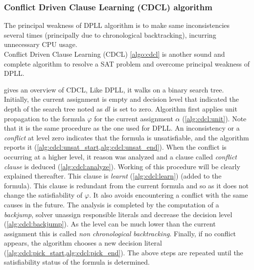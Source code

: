 %
%
\subsubsection{Conflict Driven Clause Learning (CDCL) algorithm}\label{sec:cdcl}
The principal weakness of DPLL algorithm is to make same inconsistencies several times
(principally due to chronological backtracking), incurring unnecessary CPU usage.\\
Conflict Driven Clause Learning (CDCL) \cref{algo:cdcl} is another sound and complete algorithm
to resolve a SAT problem and overcome principal weakness of DPLL.

 gives an overview of CDCL, Like DPLL,  it walks on a binary search tree.
Initially, the current assignment is empty and decision level that 
indicated the depth of the search tree noted as $dl$ is set to zero.
Algorithm first applies unit propagation to the formula $\varphi$ for the current assignment $\alpha$ (\cref{alg:cdcl:unit}).
Note that it is  the same procedure as the one used for DPLL.
An inconsistency or a \emph{conflict} at level zero indicates that the formula is unsatisfiable, and the algorithm
reports it (\cref{alg:cdcl:unsat_start,alg:cdcl:unsat_end}). When the conflict is occurring at a higher level, it
reason was analyzed and a clause called \emph{conflict clause} is deduced (\cref{alg:cdcl:analyze}).
Working of this procedure will be clearly explained thereafter.
This clause is \emph{learnt} (\cref{alg:cdcl:learn}) (added to the formula). This clause is redundant from the current
formula and so as it does not change the satisfiability of $\varphi$. It also avoids encountering a conflict with the same
causes in the future.
The analysis is completed by the computation of a \emph{backjump}, solver unassign responsible literals and decrease the decision level (\cref{alg:cdcl:backjump}). As the level can be much lower than the current assignment this is called \emph{non chronological backtracking}.
Finally, if no conflict appears, the algorithm chooses a new decision literal 
(\cref{alg:cdcl:pick_start,alg:cdcl:pick_end}).
The above steps are repeated until the satisfiability status of the
formula is determined.




